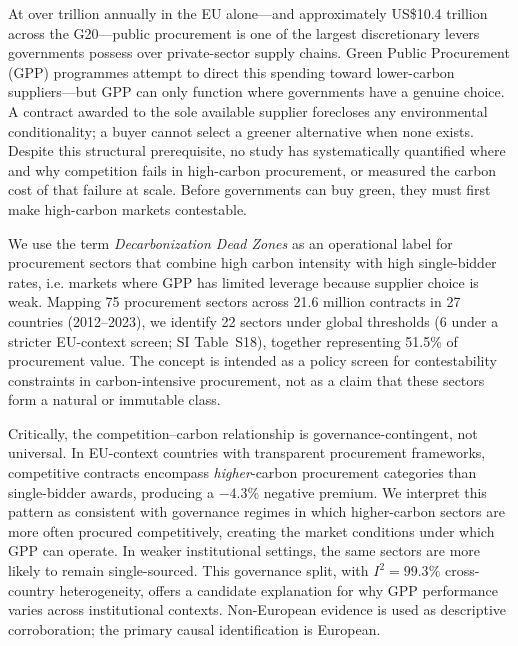 \documentclass[11pt,a4paper]{article}
\begin{document}
At over  trillion annually in the EU alone---and approximately US\$10.4 trillion across the G20\cite{oecd2023procurement}---public procurement is one of the largest discretionary levers governments possess over private-sector supply chains\cite{oecd2024greenprocurement}. Green Public Procurement (GPP) programmes attempt to direct this spending toward lower-carbon suppliers---but GPP can only function where governments have a genuine choice. A contract awarded to the sole available supplier forecloses any environmental conditionality; a buyer cannot select a greener alternative when none exists. Despite this structural prerequisite, no study has systematically quantified where and why competition fails in high-carbon procurement, or measured the carbon cost of that failure at scale. Before governments can buy green, they must first make high-carbon markets contestable.

We use the term \textit{Decarbonization Dead Zones} as an operational label for procurement sectors that combine high carbon intensity with high single-bidder rates, i.e. markets where GPP has limited leverage because supplier choice is weak. Mapping 75 procurement sectors across 21.6 million contracts in 27 countries (2012--2023), we identify 22 sectors under global thresholds (6 under a stricter EU-context screen; SI Table~S18), together representing 51.5\% of procurement value. The concept is intended as a policy screen for contestability constraints in carbon-intensive procurement, not as a claim that these sectors form a natural or immutable class.

Critically, the competition--carbon relationship is governance-contingent, not universal. In EU-context countries with transparent procurement frameworks, competitive contracts encompass \textit{higher}-carbon procurement categories than single-bidder awards, producing a $-4.3\%$ negative premium\cite{eu2014directive}. We interpret this pattern as consistent with governance regimes in which higher-carbon sectors are more often procured competitively, creating the market conditions under which GPP can operate. In weaker institutional settings, the same sectors are more likely to remain single-sourced. This governance split, with $I^2 = 99.3\%$ cross-country heterogeneity, offers a candidate explanation for why GPP performance varies across institutional contexts\cite{grandia2015implementing,cheng2018green,ortegacarrasco2025gpp}. Non-European evidence is used as descriptive corroboration; the primary causal identification is European.
\end{document}
